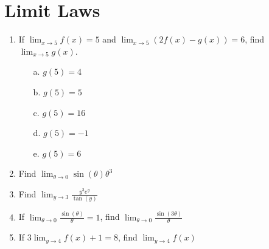 \documentclass[12pt]{report}
\begin{document}
\newcommand{\less}{\textless}
\newcommand{\greater}{\textgreater}
\newcommand{\reals}{\mathbb{R}}
\newcommand{\integers}{\mathbb{Z}}
\newcommand{\rationals}{\mathbb{Q}}
\newcommand{\dsp}{\displaystyle}



\section*{Limit Laws}

\begin{enumerate}

\item  If $\lim_{x\rightarrow 5}f(x)=5$ and $\dsp \lim_{x \to 5} \left(2f(x)-g(x)\right) = 6$, find $\lim_{x\rightarrow 5}g(x)$.\vspace{0.2cm}
\begin{enumerate}
\item[a.] $g(5) = 4$ \vspace{0.2cm}
\item[b.] $g(5) = 5$ \vspace{0.2cm}
\item[c.] $g(5) = 16$ \vspace{0.2cm}
\item[d.] $g(5) = -1$ \vspace{0.2cm}
\item[e.] $g(5) = 6$
\end{enumerate}

\item Find $\lim_{\theta\rightarrow 0}\sin(\theta)\theta^3$

\item Find $\lim_{y\rightarrow 3}\frac{y^3e^y}{\tan(y)}$

\item If $\lim_{\theta\rightarrow 0}\frac{\sin(\theta)}{\theta}=1$, find $\lim_{\theta\rightarrow 0}\frac{\sin(3\theta)}{\theta}$

\item If $3\lim_{y\rightarrow 4}f(x)+1=8$, find $\lim_{y\rightarrow 4}f(x)$

\end{enumerate}
\end{document}
